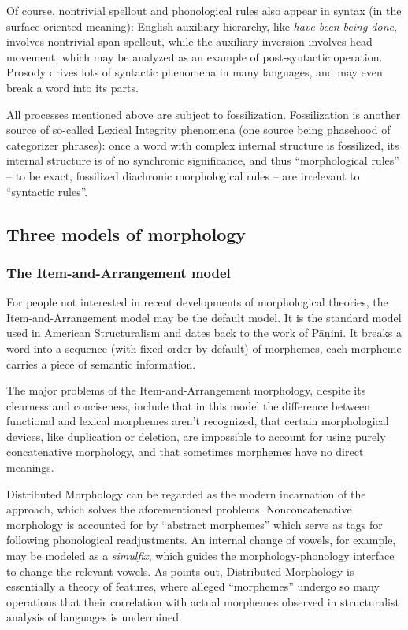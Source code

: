 \documentclass[UTF8, a4paper, oneside, scheme=plain]{ctexart}
\newcommand*{\term}[1]{\emph{#1}}
\newcommand*{\corpus}[1]{\emph{#1}}
\begin{document}
Of course, nontrivial spellout and phonological rules also appear in syntax (in the surface-oriented meaning):
English auxiliary hierarchy, like \corpus{have been being done},
involves nontrivial span spellout,
while the auxiliary inversion involves head movement,
which may be analyzed as an example of post-syntactic operation.
Prosody drives lots of syntactic phenomena in many languages,
and may even break a word into its parts. %

All processes mentioned above are subject to fossilization.
Fossilization is another source of so-called Lexical Integrity phenomena 
(one source being phasehood of categorizer phrases):
once a word with complex internal structure is fossilized,
its internal structure is of no synchronic significance,
and thus ``morphological rules'' -- to be exact, fossilized diachronic morphological rules --
are irrelevant to ``syntactic rules''.

\subsection{Three models of morphology}

\subsubsection{The Item-and-Arrangement model}\label{sec:item-and-arrange}

For people not interested in recent developments of morphological theories,
the Item-and-Arrangement model may be the default model.
It is the standard model used in American Structuralism
and dates back to the work of Pāṇini.
It breaks a word into a sequence (with fixed order by default) of morphemes,
each morpheme carries a piece of semantic information.

The major problems of the Item-and-Arrangement morphology,
despite its clearness and conciseness,
include that in this model 
the difference between functional and lexical morphemes aren't recognized,
that certain morphological devices, 
like duplication or deletion,
are impossible to account for using purely concatenative morphology,
and that sometimes morphemes have no direct meanings.

Distributed Morphology can be regarded as the modern incarnation of the approach,
which solves the aforementioned problems.
Nonconcatenative morphology is accounted for by ``abstract morphemes''
which serve as tags for following phonological readjustments.
An internal change of vowels, for example, may be modeled as a \term{simulfix},
which guides the morphology-phonology interface to change the relevant vowels. 
As \citet{anderson2017words} points out,
Distributed Morphology is essentially a theory of features,
where alleged ``morphemes'' undergo so many operations 
that their correlation with
actual morphemes observed in structuralist analysis of languages
is undermined.
\end{document}
